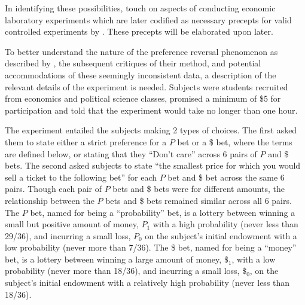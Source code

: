 \documentclass[../main.tex]{subfiles}
\begin{document}
In identifying these possibilities, \textcite{Grether1979} touch on aspects of conducting economic laboratory experiments which are later codified as necessary precepts for valid controlled experiments by \textcite{Smith1982}.
These precepts will be elaborated upon later.

To better understand the nature of the preference reversal phenomenon as described by \textcite{Grether1979}, the subsequent critiques of their method, and potential accommodations of these seemingly inconsistent data, a description of the relevant details of the experiment is needed.
Subjects were students recruited from economics and political science classes, promised a minimum of \${5} for participation and told that the experiment would take no longer than one hour.

The experiment entailed the subjects making 2 types of choices.
The first asked them to state either a strict preference for a $P$ bet or a {\$} bet, where the terms are defined below, or stating that they \enquote{Don't care} across 6 pairs of $P$ and {\$} bets.
The second asked subjects to state \enquote{the smallest price for which you would sell a ticket to the following bet} \parencite*[630]{Grether1979} for each $P$ bet and {\$} bet across the same 6 pairs.
Though each pair of $P$ bets and {\$} bets were for different amounts, the relationship between the $P$ bets and {\$} bets remained similar across all 6 pairs.
The $P$ bet, named for being a \enquote{probability} bet, is a lottery between winning a small but positive amount of money, $P_1$ with a high probability (never less than 29/36), and incurring a small loss, $P_0$ on the subject's initial endowment with a low probability (never more than 7/36).
The {\$} bet, named for being a \enquote{money} bet, is a lottery between winning a large amount of money, ${\$}_1$, with a low probability (never more than 18/36), and incurring a small loss, ${\$}_0$, on the subject's initial endowment with a relatively high probability (never less than 18/36).
\end{document}
